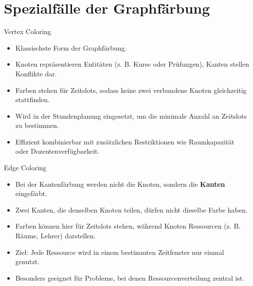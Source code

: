 \documentclass[10pt]{beamer}
\begin{document}

\section{Spezialfälle der Graphfärbung}

\begin{frame}{Vertex Coloring}
    \small
    \begin{itemize}
        \item Klassischste Form der Graphfärbung.
        \item Knoten repräsentieren Entitäten (z. B. Kurse oder Prüfungen), Kanten stellen Konflikte dar.
        \item Farben stehen für Zeitslots, sodass keine zwei verbundene Knoten gleichzeitig stattfinden.
        \item Wird in der Stundenplanung eingesetzt, um die minimale Anzahl an Zeitslots zu bestimmen.
        \item Effizient kombinierbar mit zusätzlichen Restriktionen wie Raumkapazität oder Dozentenverfügbarkeit.
    \end{itemize}
\end{frame}

\begin{frame}{Edge Coloring}
    \small
    \begin{itemize}
        \item Bei der Kantenfärbung werden nicht die Knoten, sondern die \textbf{Kanten} eingefärbt.
        \item Zwei Kanten, die denselben Knoten teilen, dürfen nicht dieselbe Farbe haben.
        \item Farben können hier für Zeitslots stehen, während Knoten Ressourcen (z. B. Räume, Lehrer) darstellen.
        \item Ziel: Jede Ressource wird in einem bestimmten Zeitfenster nur einmal genutzt.
        \item Besonders geeignet für Probleme, bei denen Ressourcenverteilung zentral ist.
    \end{itemize}
\end{frame}
\end{document}
